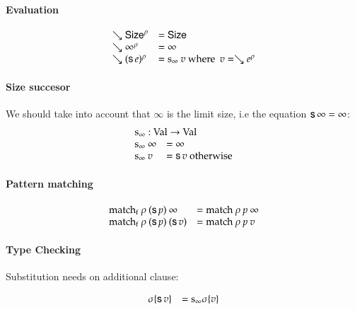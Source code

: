 \paragraph*{Evaluation}

\[
\begin{array}{ll}
\searrow \mathsf{Size}^{\rho} & = \mathsf{Size} \\
\searrow \infty^{\rho} & = \infty  \\
\searrow (\mathsf{s}\, e)^{\rho} & = \mathrm{s_{\infty}} \: v \mbox{ where } \: v = \searrow e^{\rho} \\ 
\end{array}
\]

\paragraph*{Size succesor}
We should take into account that $\infty$ is the limit size, i.e the equation $\mathsf{s}\, \infty = \infty$:
\[
\begin{array}[t]{ll}
\multicolumn{2}{l}{\sinfty : \Val \ra \Val}\\ 
\sinfty \: \infty & = \infty\\
\sinfty \:  v & = \s v  \mbox{ otherwise}\\ 
\end{array}
\]

\paragraph*{Pattern matching}
\[
\begin{array}{ll}
\mathrm{match_f} \: \rho \: (\mathsf{s}\, p) \: \infty & = \mathrm{match} \: \rho \: p \: \infty \\
\mathrm{match_f} \: \rho \: (\mathsf{s}\, p) \: (\mathsf{s}\, v) & = \mathrm{match} \: \rho \: p \: v \\
\end{array}
\]

\paragraph*{Type Checking}

Substitution needs on additional clause:

\[
\begin{array}{ll}
\sigma\{\mathsf{s}\, v\} & = \mathrm{s_{\infty}} \sigma\{v\} \\
\end{array}
\]

